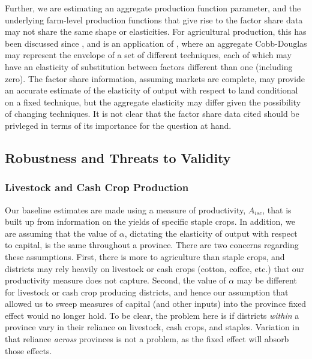 \documentclass[11pt]{article}
\begin{document}
Further, we are estimating an aggregate production function parameter, and the underlying farm-level production functions that give rise to the factor share data may not share the same shape or elasticities. For agricultural production, this has been discussed since \citet{Hayami:1970ly}, and is an application of \citet{houthakker1955}, where an aggregate Cobb-Douglas may represent the envelope of a set of different techniques, each of which may have an elasticity of substitution between factors different than one (including zero). The factor share information, assuming markets are complete, may provide an accurate estimate of the elasticity of output with respect to land conditional on a fixed technique, but the aggregate elasticity may differ given the possibility of changing techniques. It is not clear that the factor share data cited should be privleged in terms of its importance for the question at hand.

\subsection{Robustness and Threats to Validity}
\subsubsection{Livestock and Cash Crop Production}
Our baseline estimates are made using a measure of productivity, $A_{isc}$, that is built up from information on the yields of specific staple crops. In addition, we are assuming that the value of $\alpha$, dictating the elasticity of output with respect to capital, is the same throughout a province. There are two concerns regarding these assumptions. First, there is more to agriculture than staple crops, and districts may rely heavily on livestock or cash crops (cotton, coffee, etc.) that our productivity measure does not capture. Second, the value of $\alpha$ may be different for livestock or cash crop producing districts, and hence our assumption that allowed us to sweep measures of capital (and other inputs) into the province fixed effect would no longer hold. To be clear, the problem here is if districts \textit{within} a province vary in their reliance on livestock, cash crops, and staples. Variation in that reliance \textit{across} provinces is not a problem, as the fixed effect will absorb those effects.
\end{document}
